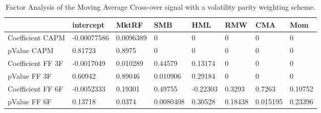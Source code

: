 \begin{table}[H]
\centering
\begin{tabular}{llllllll}
& intercept & MktRF & SMB & HML & RMW & CMA & Mom \\ 
\hline 
Coefficient CAPM & -0.00077586 & 0.0096389 & 0 & 0 & 0 & 0 & 0 \\ 
pValue CAPM & 0.81723 & 0.8975 & 0 & 0 & 0 & 0 & 0 \\ 
Coefficient FF 3F & -0.0017049 & 0.010289 & 0.44579 & 0.13174 & 0 & 0 & 0 \\ 
pValue FF 3F & 0.60942 & 0.89046 & 0.010906 & 0.29184 & 0 & 0 & 0 \\ 
Coefficient FF 6F & -0.0052333 & 0.19301 & 0.49755 & -0.22303 & 0.3293 & 0.7263 & 0.10752 \\ 
pValue FF 6F & 0.13718 & 0.0374 & 0.0080408 & 0.30528 & 0.18438 & 0.015195 & 0.23396 \\ 
\hline
\end{tabular}
\caption{Factor Analysis of the Moving Average Cross-over signal with a volatility parity weighting scheme.}
\label{MAVP_FACTOR}
\end{table}